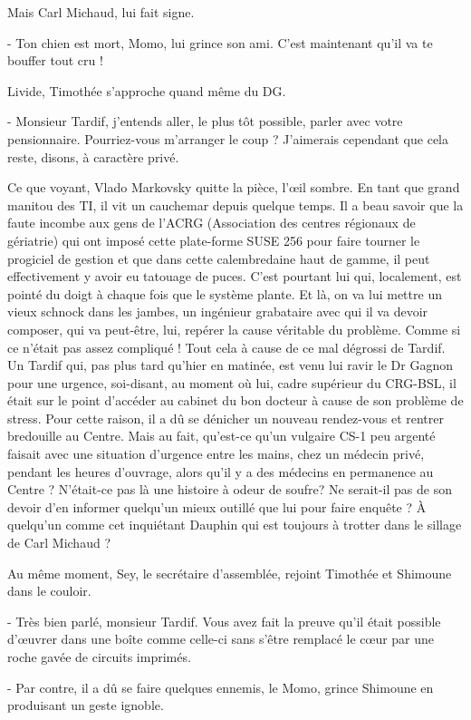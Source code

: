 Mais Carl Michaud, lui fait signe.

- Ton chien est mort, Momo, lui grince son ami. C’est maintenant qu’il va te bouffer tout cru !

Livide, Timothée s’approche quand même du DG.

- Monsieur Tardif, j’entends aller, le plus tôt possible, parler avec votre pensionnaire. Pourriez-vous m’arranger le coup ? J’aimerais cependant que cela reste, disons, à caractère privé.

Ce que voyant, Vlado Markovsky quitte la pièce, l’œil sombre. En tant que grand manitou des TI, il vit un cauchemar depuis quelque temps. Il a beau savoir que la faute incombe aux gens de l’ACRG (Association des centres régionaux de gériatrie) qui ont imposé cette plate-forme SUSE 256 pour faire tourner le progiciel de gestion et que dans cette calembredaine haut de gamme, il peut effectivement y avoir eu tatouage de puces. C’est pourtant lui qui, localement, est pointé du doigt à chaque fois que le système plante. Et là, on va lui mettre un vieux schnock dans les jambes, un ingénieur grabataire avec qui il va devoir composer, qui va peut-être, lui, repérer la cause véritable du problème. Comme si ce n’était pas assez compliqué ! Tout cela à cause de ce mal dégrossi de Tardif. Un Tardif qui, pas plus tard qu’hier en matinée, est venu lui ravir le Dr Gagnon pour une urgence, soi-disant, au moment où lui, cadre supérieur du CRG-BSL, il était sur le point d’accéder au cabinet du bon docteur à cause de son problème de stress. Pour cette raison, il a dû se dénicher un nouveau rendez-vous et rentrer bredouille au Centre. Mais au fait, qu’est-ce qu’un vulgaire CS-1 peu argenté faisait avec une situation d’urgence entre les mains, chez un médecin privé, pendant les heures d’ouvrage, alors qu’il y a des médecins en permanence au Centre ? N’était-ce pas là une histoire à odeur de soufre? Ne serait-il pas de son devoir d’en informer quelqu’un mieux outillé que lui pour faire enquête ? À quelqu’un comme cet inquiétant Dauphin qui est toujours à trotter dans le sillage de Carl Michaud ?

Au même moment, Sey, le secrétaire d’assemblée, rejoint Timothée et Shimoune dans le couloir.

- Très bien parlé, monsieur Tardif. Vous avez fait la preuve qu’il était possible d’œuvrer dans une boîte comme celle-ci sans s’être remplacé le cœur par une roche gavée de circuits imprimés.

- Par contre, il a dû se faire quelques ennemis, le Momo, grince Shimoune en produisant un geste ignoble.

